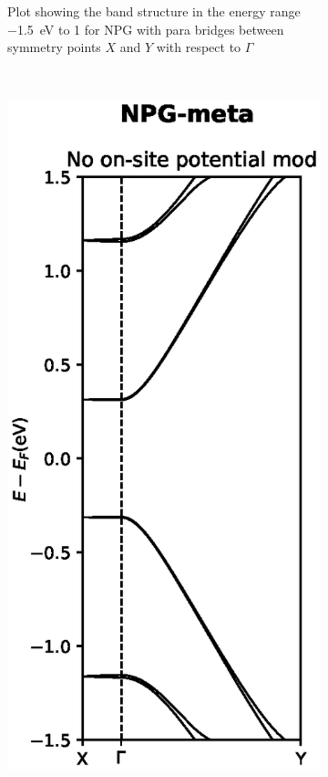 \begin{figure}
\begin{subfigure}[b]{0.3\textwidth}
		\caption{Plot showing the band structure in the energy range \SI{-1.5}{\electronvolt} to 1 for NPG with para bridges between symmetry points \(X\) and \(Y\) with respect to \(\Gamma\)}
		\label{parabs}
	\end{subfigure}
	~ %
	\begin{subfigure}[b]{0.3\textwidth}
		\includegraphics[width=\textwidth]{Figures/metaNPGBS.eps}

\end{subfigure}
\end{figure}
